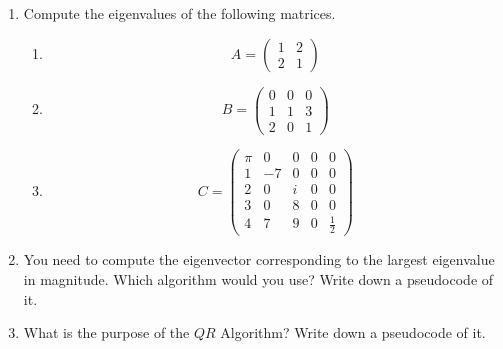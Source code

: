 \vspace*{-0.5cm}
\begin{enumerate}
\item Compute the eigenvalues of the following matrices.

\begin{enumerate}
	\item 
	$$
	A = \begin{pmatrix}
	1&2\\
	2&1
	\end{pmatrix}
	$$
	\item
	$$
	B = \begin{pmatrix}
	0&0&0\\
	1&1&3\\
	2&0&1
	\end{pmatrix}
	$$
	\item 
	$$C=
	\begin{pmatrix}
	\pi& 0& 0& 0 &0\\
	1 & -7&  0& 0 &0\\
	2 & 0& i  & 0 &0\\
	3 & 0& 8  & 0 & 0\\
	4 & 7& 9& 0& \frac{1}{2}
	\end{pmatrix}
	$$
\end{enumerate}
\item You need to compute the eigenvector corresponding to the largest eigenvalue in magnitude. Which algorithm would you use? Write down a pseudocode of it.
\item What is the purpose of the $QR$ Algorithm? Write down a pseudocode of it.
%
%

\end{enumerate}
